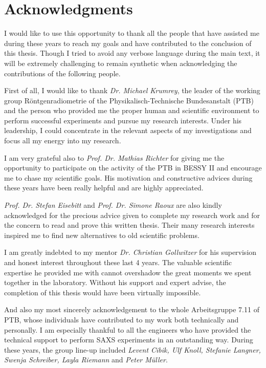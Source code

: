 \pagestyle{empty}
\noindent
\section*{Acknowledgments}

I would like to use this opportunity to thank all the people that have assisted me during these years to reach my goals and have contributed to the conclusion of this thesis. Though I tried to avoid any verbose language during the main text, it will be extremely challenging to remain synthetic when acknowledging the contributions of the following people.
\vspace{2ex}

\noindent First of all, I would like to thank \emph{Dr. Michael Krumrey}, the leader of the working group Röntgenradiometrie of the Physikalisch-Technische Bundesanstalt (PTB) and the person who provided me the proper human and scientific environment to perform successful experiments and pursue my research interests. Under his leadership, I could concentrate in the relevant aspects of my investigations and focus all my energy into my research.
\vspace{2ex}

\noindent I am very grateful also to \emph{Prof. Dr. Mathias Richter} for giving me the opportunity to participate on the activity of the PTB in BESSY II and encourage me to chase my scientific goals. His motivation and constructive advices during these years have been really helpful and are highly appreciated. 
\vspace{2ex}

\noindent \emph{Prof. Dr. Stefan Eisebitt} and \emph{Prof. Dr. Simone Raoux} are also kindly acknowledged for the precious advice given to complete my research work and for the concern to read and prove this written thesis. Their many research interests inspired me to find new alternatives to old scientific problems.
\vspace{2ex}

\noindent I am greatly indebted to my mentor \emph{Dr. Christian Gollwitzer} for his supervision and honest interest throughout these last 4 years. The valuable scientific expertise he provided me with cannot overshadow the great moments we spent together in the laboratory. Without his support and expert advise, the completion of this thesis would have been virtually impossible.
\vspace{2ex}

\noindent And also my most sincerely acknowledgement to the whole Arbeitsgruppe 7.11 of PTB, whose individuals have contributed to my work both technically and personally. I am especially thankful to all the engineers who have provided the technical support to perform SAXS experiments in an outstanding way. During these years, the group line-up included \emph{Levent Cibik, Ulf Knoll, Stefanie Langner, Swenja Schreiber, Layla Riemann} and \emph{Peter Müller}.
\vspace{2ex}

